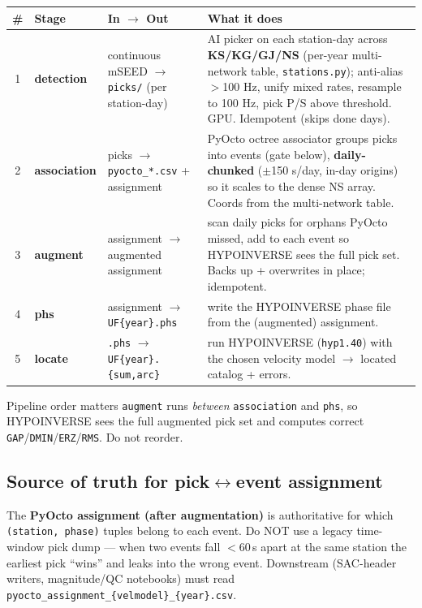 \documentclass[11pt]{article}
\newcommand{\code}[1]{\texttt{#1}}
\begin{document}
\begin{center}
\small
\begin{longtable}{@{}c>{\raggedright\arraybackslash}p{2.4cm}>{\raggedright\arraybackslash}p{5.0cm}>{\raggedright\arraybackslash}p{5.2cm}@{}}
\toprule
\# & Stage & In $\rightarrow$ Out & What it does \\
\midrule
\endhead
1 & \textbf{detection} & continuous mSEED $\rightarrow$ \code{picks/} (per station-day) & AI picker on each station-day across \textbf{KS/KG/GJ/NS} (per-year multi-network table, \code{stations.py}); anti-alias $>$100 Hz, unify mixed rates, resample to 100 Hz, pick P/S above threshold. GPU. Idempotent (skips done days). \\
2 & \textbf{association} & picks $\rightarrow$ \code{pyocto\_*.csv} + assignment & PyOcto octree associator groups picks into events (gate below), \textbf{daily-chunked} ($\pm$150 s/day, in-day origins) so it scales to the dense NS array. Coords from the multi-network table. \\
3 & \textbf{augment} & assignment $\rightarrow$ augmented assignment & scan daily picks for orphans PyOcto missed, add to each event so HYPOINVERSE sees the full pick set. Backs up + overwrites in place; idempotent. \\
4 & \textbf{phs} & assignment $\rightarrow$ \code{UF\{year\}.phs} & write the HYPOINVERSE phase file from the (augmented) assignment. \\
5 & \textbf{locate} & \code{.phs} $\rightarrow$ \code{UF\{year\}.\{sum,arc\}} & run HYPOINVERSE (\code{hyp1.40}) with the chosen velocity model $\rightarrow$ located catalog + errors. \\
\bottomrule
\end{longtable}
\end{center}

\begin{warnbox}{Pipeline order matters}
\code{augment} runs \emph{between} \code{association} and \code{phs}, so HYPOINVERSE sees the full augmented pick
set and computes correct \code{GAP}/\code{DMIN}/\code{ERZ}/\code{RMS}. Do not reorder.
\end{warnbox}

\subsection{Source of truth for pick$\leftrightarrow$event assignment}
The \textbf{PyOcto assignment (after augmentation)} is authoritative for which \code{(station, phase)} tuples
belong to each event. Do NOT use a legacy time-window pick dump — when two events fall $<$60\,s apart at the same
station the earliest pick ``wins'' and leaks into the wrong event. Downstream (SAC-header writers, magnitude/QC
notebooks) must read \code{pyocto\_assignment\_\{velmodel\}\_\{year\}.csv}.
\end{document}
